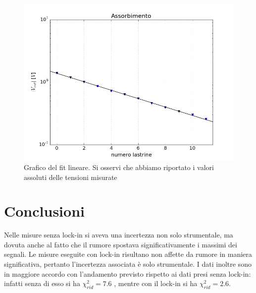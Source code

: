 \documentclass[10pt,a4paper]{article}
\begin{document}
\begin{figure}[!htb]
  \centering
\includegraphics[scale=0.7]{plot-lin2.png}
\caption{Grafico del fit lineare. Si osservi che abbiamo riportato i valori assoluti delle tensioni misurate\label{plot2}}
\end{figure}

\section{Conclusioni}
Nelle misure senza lock-in si aveva una incertezza non solo strumentale, ma dovuta anche al fatto che il rumore spostava significativamente i massimi dei segnali.
Le misure eseguite con lock-in risultano non affette da rumore in maniera significativa, pertanto l'incertezza associata è solo strumentale.
I dati inoltre sono in maggiore accordo con l'andamento previsto rispetto ai dati presi senza lock-in: infatti senza di esso si ha $\chi_{rid} ^2 = 7.6$ ,  mentre con il lock-in si ha $\chi_{rid}^2 = 2.6$.%
\end{document}
